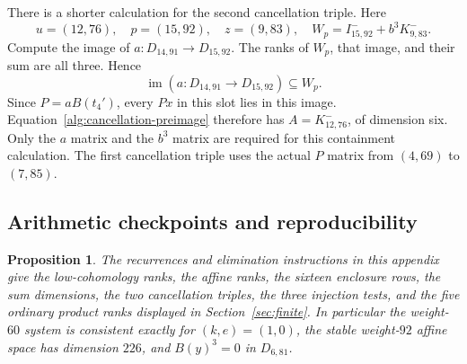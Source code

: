 \documentclass[11pt]{article}
\newtheorem{proposition}[theorem]{Proposition}
\theoremstyle{definition}
\theoremstyle{remark}
\numberwithin{equation}{section}
\begin{document}
There is a shorter calculation for the second cancellation triple.
Here
\[
 u=(12,76),\quad p=(15,92),\quad z=(9,83),\quad
 W_p=I^-_{15,92}+b^3K^-_{9,83}.
\]
Compute the image of $a:D_{14,91}\to D_{15,92}$.  The ranks of
$W_p$, that image, and their sum are all three.  Hence
\begin{equation}\label{alg:second-factorization}
 \operatorname{im}(a:D_{14,91}\to D_{15,92})\subseteq W_p.
\end{equation}
Since $P=aB(t_4')$, every $Px$ in this slot lies in this image.
Equation~\eqref{alg:cancellation-preimage} therefore has
$A=K^-_{12,76}$, of dimension six.  Only the $a$ matrix and the
$b^3$ matrix are required for this containment calculation.  The
first cancellation triple uses the actual $P$ matrix from $(4,69)$
to $(7,85)$.

\subsection{Arithmetic checkpoints and reproducibility}

\begin{proposition}\label{alg:table-verification}
The recurrences and elimination instructions in this appendix give
the low-cohomology ranks, the affine ranks, the sixteen enclosure rows,
the sum dimensions, the two cancellation triples, the three injection
tests, and the five ordinary product ranks displayed in
Section~\ref{sec:finite}.  In particular the weight-$60$ system is
consistent exactly for $(k,e)=(1,0)$, the stable weight-$92$ affine
space has dimension $226$, and $B(y)^3=0$ in $D_{6,81}$.
\end{proposition}
\end{document}
